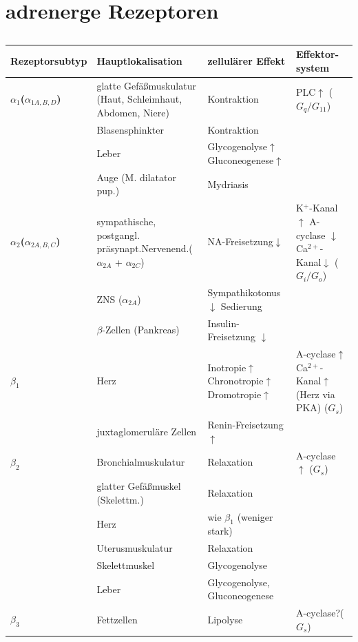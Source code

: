 \documentclass[10pt,a4paper]{report}
\begin{document}
\section{adrenerge Rezeptoren}
\begin{table}[htbp]
\caption{}
\begin{tabularx}{\textwidth}{XXXX}
\hline
\textbf{Rezeptorsubtyp} & \textbf{Hauptlokalisation} & \textbf{zellulärer Effekt} & \textbf{Effektor- system} \\ \hline
\textbf{$\alpha_1$($\alpha_{1A,B,D}$)} & glatte Gefäßmuskulatur (Haut, Schleimhaut, Abdomen, Niere) & Kontraktion & PLC$\uparrow$ ($G_q/G_{11}$) \\ \hline
& Blasensphinkter & Kontraktion & \\ \hline
& Leber & Glycogenolyse$\uparrow$ Gluconeogenese$\uparrow$ &  \\ \hline
& Auge (M. dilatator pup.) & Mydriasis & \textbf{} \\ \hline
\textbf{$\alpha_2$($\alpha_{2A,B,C}$)} & sympathische, postgangl. präsynapt.Nervenend.($\alpha_{2A}$ + $\alpha_{2C}$)&NA-Freisetzung$\downarrow$ &  K$^+$-Kanal$\uparrow$ A-cyclase $\downarrow$ Ca$^{2+}$-Kanal$\downarrow$ ($G_i/G_o$) \\ \hline
& ZNS	($\alpha_{2A}$) & Sympathikotonus $\downarrow$ Sedierung &  \\ \hline
& $\beta$-Zellen (Pankreas) & Insulin-Freisetzung $\downarrow$ & \\ \hline
{$\beta_1$} & Herz & Inotropie$\uparrow$ Chronotropie$\uparrow$ Dromotropie$\uparrow$ &  A-cyclase$\uparrow$ Ca$^{2+}$-Kanal$\uparrow$ (Herz via PKA) ($G_s$) \\ \hline
& juxtaglomeruläre Zellen & Renin-Freisetzung $\uparrow$ & \\ \hline
\textbf{$\beta_2$} & Bronchialmuskulatur & Relaxation & A-cyclase $\uparrow$ ($G_s$) \\ \hline
& glatter Gefäßmuskel (Skelettm.) & Relaxation & \\ \hline
& Herz & wie $\beta_1$ (weniger stark) & \\ \hline
& Uterusmuskulatur & Relaxation &  \\ \hline
& Skelettmuskel & Glycogenolyse &  \\ \hline
& Leber & Glycogenolyse, Gluconeogenese & \\ \hline
\textbf{$\beta_3$} & Fettzellen & Lipolyse & A-cyclase?($G_s$) \\ \hline
\end{tabularx}
\label{}
\end{table}
\end{document}
